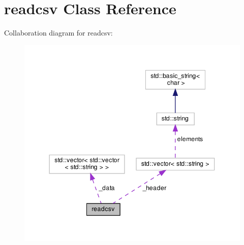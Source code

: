 \hypertarget{classreadcsv}{}\section{readcsv Class Reference}
\label{classreadcsv}


Collaboration diagram for readcsv\+:
\nopagebreak
\begin{figure}[H]
\begin{center}
\leavevmode
\includegraphics[width=344pt]{classreadcsv__coll__graph}
\end{center}
\end{figure}
